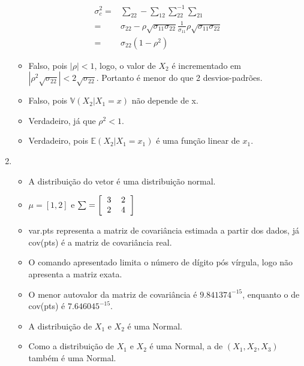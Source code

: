 \documentclass[11pt,a4paper]{book}
\begin{document}
\begin{enumerate}
		\begin{eqnarray*}
			\sigma_c^2 =&\sum_{22}-\sum_{12}\sum_{22}^{-1}\sum_{21}\\
			=&\sigma_{22}-\rho\sqrt{\sigma_{11}\sigma_{22}}\frac{1}{\sigma_{11}}\rho\sqrt{\sigma_{11}\sigma_{22}}\\
			=&\sigma_{22}(1-\rho^2)
		\end{eqnarray*}
		\begin{itemize}
			\item Falso, pois $|\rho|<1$, logo, o valor de $X_2$ é incrementado em $|\rho^2\sqrt{\sigma_{22}}|<2\sqrt{\sigma_{22}}$.
			Portanto é menor do que 2 desvios-padrões.
			\item Falso, pois $\mathbb{V}(X_2|X_1=x)$ não depende de x.
			\item Verdadeiro, já que $\rho^2<1$.
			\item Verdadeiro, pois $\mathbb{E}(X_2|X_1=x_1)$ é uma função linear de $x_1$.
		\end{itemize}
		\item
		\begin{itemize}
			\item A distribuição do vetor é uma distribuição normal.
			\item $\mu=[1,2]$ e $\sum=\left[
			\begin{tabular}{c c}
			3 & 2\\
			2 & 4\\
			\end{tabular}
			\right]$
			\item var.pts representa a matriz de covariância estimada a partir dos dados, já cov(pts) é a matriz de covariância real.
			\item O comando apresentado limita o número de dígito pós vírgula, logo não apresenta a matriz exata.
			\item O menor autovalor da matriz de covariância é $9.841374^{-15}$, enquanto o de cov(pts) é $7.646045^{-15}$.
			\item A distribuição de $X_1$ e $X_2$ é uma Normal.
			\item Como a distribuição de $X_1$ e $X_2$ é uma Normal, a de $(X_1,X_2,X_3)$ também é uma Normal.
		\end{itemize}
		

\end{enumerate}
\end{document}
